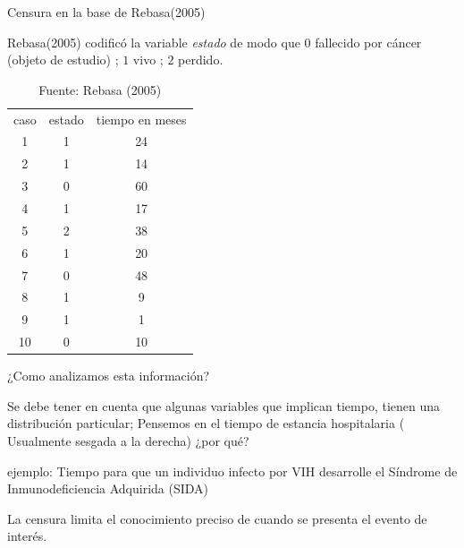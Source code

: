 \documentclass{beamer}
\begin{document}
\begin{frame}{Censura en la base de Rebasa(2005)}

Rebasa(2005) codificó la variable \textit{estado} de modo que $0$ fallecido por cáncer (objeto de estudio) ; $1$ vivo ; $2$ perdido.  

\begin{table}[]
\centering
\begin{tabular}{ccc}
caso & estado & tiempo en meses \\
1    & 1      & 24              \\
2    & 1      & 14              \\
3    & 0      & 60              \\
4    & 1      & 17              \\
5    & 2      & 38              \\
6    & 1      & 20              \\
7    & 0      & 48              \\
8    & 1      & 9               \\
9    & 1      & 1               \\
10   & 0      & 10             
\end{tabular}
\caption{Fuente: Rebasa (2005)}
\label{tab:my-table}
\end{table}

\end{frame}



\begin{frame}{¿Como analizamos esta información?}

Se debe tener en cuenta que algunas variables que implican tiempo, tienen una distribución particular; Pensemos en el tiempo de estancia hospitalaria ( Usualmente sesgada a la derecha) ¿por qué?

\begin{block}

ejemplo: Tiempo para que un individuo infecto por VIH desarrolle el Síndrome de Inmunodeficiencia Adquirida (SIDA)

\end{block}


\begin{block}

La censura limita el conocimiento preciso de cuando se presenta el evento de interés. 

\end{block}


\end{frame}
\end{document}
